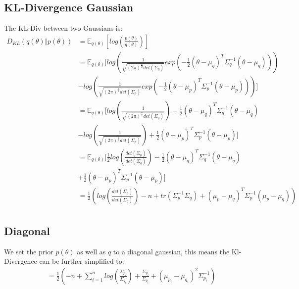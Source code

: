 \documentclass[a4paper]{scrartcl}
\begin{document}
  \subsection{KL-Divergence Gaussian}
    The KL-Div between two Gaussians is:
    \begin{align*}
      D_{KL}(q(\theta) \Vert p(\theta))
      &= \mathbb{E}_{q(\theta)} [log(\frac{p(\theta)}{q(\theta)})] \\
      &= \mathbb{E}_{q(\theta)} [log(\frac{1}{\sqrt{(2 \pi)^{\frac{n}{2}} det(\Sigma_q)}} exp(-\frac{1}{2} (\theta - \mu_q)^T \Sigma^{-1}_q (\theta - \mu_q)))\\
      &- log(\frac{1}{\sqrt{(2 \pi)^{\frac{n}{2}} det(\Sigma_p)}} exp(-\frac{1}{2} (\theta - \mu_p)^T \Sigma^{-1}_p (\theta - \mu_p)))] \\
      &= \mathbb{E}_{q(\theta)} [log(\frac{1}{\sqrt{(2 \pi)^{\frac{n}{2}} det(\Sigma_q)}}) -\frac{1}{2} (\theta - \mu_q)^T \Sigma^{-1}_q (\theta - \mu_q)\\
      &- log(\frac{1}{\sqrt{(2 \pi)^{\frac{n}{2}} det(\Sigma_p)}}) + \frac{1}{2} (\theta - \mu_p)^T \Sigma^{-1}_p (\theta - \mu_p)] \\
      &= \mathbb{E}_{q(\theta)} [\frac{1}{2}log(\frac{det(\Sigma_p)}{det(\Sigma_q)}) -\frac{1}{2} (\theta - \mu_q)^T \Sigma^{-1}_q (\theta - \mu_q)\\
      & + \frac{1}{2} (\theta - \mu_p)^T \Sigma^{-1}_p (\theta - \mu_p)] \\
      &= \frac{1}{2}(log(\frac{det(\Sigma_p)}{det(\Sigma_q)}) -n + tr(\Sigma^{-1}_p \Sigma_q ) + (\mu_p - \mu_q)^T \Sigma^{-1}_p (\mu_p - \mu_q))\\
  \end{align*}

  \subsection{Diagonal}
      We set the prior $p(\theta)$ as well as $q$ to a diagonal gaussian, this
      means the Kl-Divergence can be further simplified to:
      \begin{align}
          &= \frac{1}{2} (- n + \sum_{i=1}^n log(\frac{ \Sigma_{p_i}}{\Sigma_{q_i}}) + \frac{\Sigma_{q_i}}{\Sigma_{p_i}}  +  (\mu_{p_i} - \mu_{q_i})^2 \Sigma^{-1}_{p_i})
      \end{align}
\end{document}
